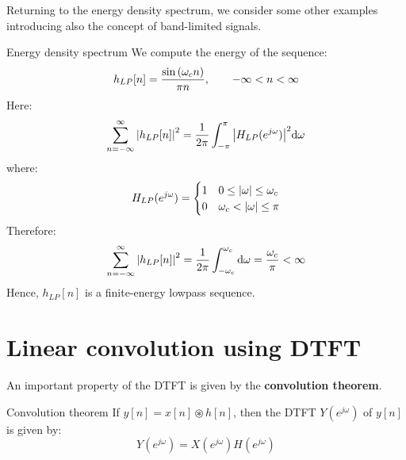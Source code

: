 \documentclass[../../main/main.tex]{subfiles}
\begin{document}
Returning to the energy density spectrum, we consider some other examples introducing also the concept of band-limited signals.

\begin{example}{Energy density spectrum}{}
    We compute the energy of the sequence:
    \begin{equation}
        h_{LP}[n]
        =
        \frac{\sin\qty(\omega_{c}n)}{\pi n},
        \qquad -\infty < n < \infty
        \label{eq:L09_S15_1}
    \end{equation}
    Here:
    \begin{equation}
        \sum_{n=-\infty}^{\infty} \abs{h_{LP}[n]}^2
        =
        \frac{1}{2\pi} \int_{-\pi}^{\pi} \abs{H_{LP}(e^{j\omega})}^2 \mathrm{d}{\omega}
        \label{eq:L09_S15_2}
    \end{equation}
    where:
    \begin{equation}
        H_{LP}(e^{j\omega})
        =
        \begin{cases}
            1   &   0 \le \abs{\omega} \le \omega_{c}   \\
            0   &   \omega_{c} < \abs{\omega} \le \pi
        \end{cases}
        \label{eq:L09_S15_3}
    \end{equation}
    Therefore:
    \begin{equation}
        \sum_{n=-\infty}^{\infty} \abs{h_{LP}[n]}^2
        =
        \frac{1}{2\pi} \int_{-\omega_{c}}^{\omega_{c}} \mathrm{d}{\omega}
        =
        \frac{\omega_{c}}{\pi}
        <
        \infty
        \label{eq:L09_S16_1}
    \end{equation}
    Hence, \( h_{LP}[n] \) is a finite-energy lowpass sequence.
\end{example}





\section{Linear convolution using DTFT}
An important property of the DTFT is given by the \textbf{convolution theorem}.

\begin{theorem}{Convolution theorem}{}
    If \( y[n] = x[n] \circledast h[n] \), then the DTFT \( Y(e^{j\omega}) \) of \( y[n] \) is given by:
    \begin{equation}
        Y(e^{j\omega})
        =
        X(e^{j\omega}) H(e^{j\omega})
        \label{eq:L09_S17_1}
    \end{equation}
\end{theorem}
\end{document}
